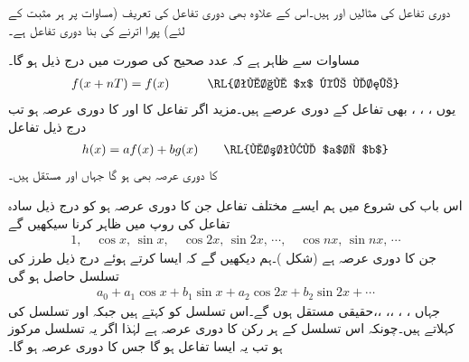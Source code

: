 دوری تفاعل کی مثالیں  اور  ہیں۔اس کے علاوہ  بھی دوری تفاعل کی تعریف (مساوات  پر ہر مثبت  کے لئے) پورا اترنے کی بنا  دوری تفاعل ہے۔

مساوات  سے ظاہر ہے کہ عدد صحیح  کی صورت میں درج ذیل ہو گا۔
\begin{align*}
f(x+nT)=f(x)\quad \quad \quad \text{\RL{تمام $x$ کے لئے}}
\end{align*}
یوں ، ، ،  بھی تفاعل  کے دوری عرصے ہیں۔مزید اگر تفاعل  کا اور  کا دوری عرصہ  ہو تب درج ذیل تفاعل
\begin{align*}
h(x)=af(x)+bg(x)\quad \quad \text{\RL{مستقل $a$، $b$}}
\end{align*}
 کا دوری عرصہ بھی  ہو گا جہاں  اور  مستقل ہیں۔

اس باب کی شروع میں ہم ایسے مختلف تفاعل جن کا دوری عرصہ  ہو کو درج ذیل سادہ تفاعل کی  روپ میں ظاہر کرنا سیکھیں گے
\begin{align*}
1,\quad \cos x,\, \sin x,\quad \cos 2x,\, \sin 2x,\,\cdots, \quad \cos nx,\, \sin nx,\,\cdots
\end{align*}
جن کا دوری عرصہ  ہے (شکل )۔ہم دیکھیں گے کہ  ایسا کرتے ہوئے درج ذیل طرز کی تسلسل حاصل ہو گی
\begin{align}\label{مساوات_فوریئر_دوری_تعریف_ب}
a_0+a_1\cos x+b_1\sin x+a_2\cos 2x+b_2\sin 2x+\cdots
\end{align}
جہاں ، ، ،، ،، حقیقی مستقل ہوں گے۔اس تسلسل کو  کہتے ہیں جبکہ  اور  تسلسل کی  کہلاتے ہیں۔چونکہ اس تسلسل کے ہر رکن کا دوری عرصہ  ہے لہٰذا اگر یہ تسلسل مرکوز ہو تب یہ ایسا تفاعل ہو گا جس کا دوری عرصہ  ہو گا۔
 
